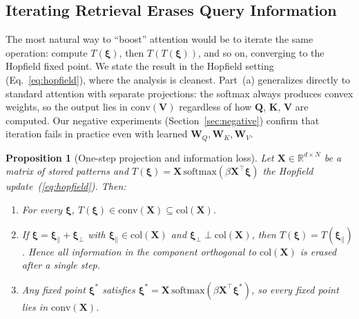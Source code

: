 \documentclass{article}
\newtheorem{proposition}{Proposition}
\theoremstyle{definition}
\begin{document}
\subsection{Iterating Retrieval Erases Query Information}

The most natural way to ``boost'' attention would be to iterate the same operation: compute $T(\boldsymbol{\xi})$, then $T(T(\boldsymbol{\xi}))$, and so on, converging to the Hopfield fixed point.
We state the result in the Hopfield setting (Eq.~\ref{eq:hopfield}), where the analysis is cleanest.
Part~(a) generalizes directly to standard attention with separate projections: the softmax always produces convex weights, so the output lies in $\mathrm{conv}(\mathbf{V})$ regardless of how $\mathbf{Q}$, $\mathbf{K}$, $\mathbf{V}$ are computed.
Our negative experiments (Section~\ref{sec:negative}) confirm that iteration fails in practice even with learned $\mathbf{W}_Q, \mathbf{W}_K, \mathbf{W}_V$.

\begin{proposition}[One-step projection and information loss]
\label{prop:erasure}
Let $\mathbf{X} \in \mathbb{R}^{d \times N}$ be a matrix of stored patterns and $T(\boldsymbol{\xi}) = \mathbf{X}\,\mathrm{softmax}(\beta \mathbf{X}^\top \boldsymbol{\xi})$ the Hopfield update~(\ref{eq:hopfield}).
Then:
\begin{enumerate}
    \item[(a)] For every $\boldsymbol{\xi}$, $T(\boldsymbol{\xi}) \in \mathrm{conv}(\mathbf{X}) \subseteq \mathrm{col}(\mathbf{X})$.

    \item[(b)] If $\boldsymbol{\xi} = \boldsymbol{\xi}_\parallel + \boldsymbol{\xi}_\perp$ with $\boldsymbol{\xi}_\parallel \in \mathrm{col}(\mathbf{X})$ and $\boldsymbol{\xi}_\perp \perp \mathrm{col}(\mathbf{X})$, then $T(\boldsymbol{\xi}) = T(\boldsymbol{\xi}_\parallel)$.
    Hence all information in the component orthogonal to $\mathrm{col}(\mathbf{X})$ is erased after a single step.

    \item[(c)] Any fixed point $\boldsymbol{\xi}^*$ satisfies $\boldsymbol{\xi}^* = \mathbf{X}\,\mathrm{softmax}(\beta \mathbf{X}^\top \boldsymbol{\xi}^*)$, so every fixed point lies in $\mathrm{conv}(\mathbf{X})$.
\end{enumerate}
\end{proposition}
\end{document}
